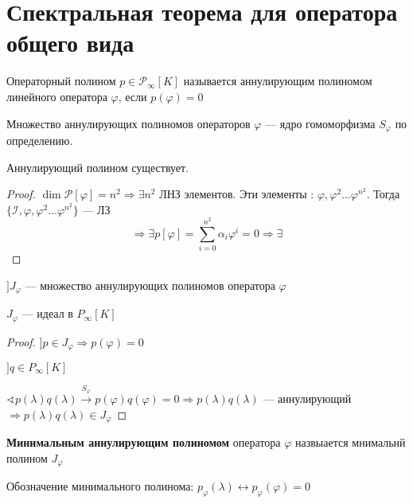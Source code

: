 

\cfoot{}



\section*{Спектральная теорема для оператора общего вида}

\begin{definition}
    Операторный полином $p\in \mathcal P_\infty [K]$ называется аннулирующим полиномом линейного оператора $\varphi$, если $p(\varphi)=0$
\end{definition}
\begin{remark}
    Множество аннулирующих полиномов операторов $\varphi$ --- ядро гомоморфизма $S_\varphi$ по определению.
\end{remark}

\begin{theorem}
    Аннулирующий полином существует.
\end{theorem}
\begin{proof}
    $\dim \mathcal P [\varphi] = n^2 \Rightarrow \exists n^2$ ЛНЗ элементов. Эти элементы : $\varphi, \varphi^2 \ldots \varphi^{n^2}$. Тогда $\{\mathcal I, \varphi, \varphi^2 \ldots \varphi^{n^2}\}$ --- ЛЗ
    $$\Rightarrow \exists p[\varphi] = \sum_{i=0}^{n^2} \alpha_i\varphi^i = 0 \Rightarrow \exists$$
\end{proof}

$] J_\varphi$ --- множество аннулирующих полиномов оператора $\varphi$
\begin{lemma}
    $J_\varphi$ --- идеал в $P_\infty [K]$
\end{lemma}
\begin{proof}
    $] p\in J_\varphi \Rightarrow p(\varphi)=0$

    $] q\in P_\infty[K]$

    $\sphericalangle p(\lambda)q(\lambda) \xrightarrow{S_\varphi} p(\varphi)q(\varphi)=0 \Rightarrow p(\lambda)q(\lambda)$ --- аннулирующий $\Rightarrow p(\lambda)q(\lambda)\in J_\varphi$
\end{proof}
\begin{definition}
    \textbf{Минимальным аннулирующим полиномом} оператора $\varphi$ назвыается мнимальнй полином $J_\varphi$
\end{definition}
\begin{remark}
    Обозначение минимального полинома: $p_\varphi(\lambda) \leftrightarrow p_\varphi(\varphi)=0$
\end{remark}

